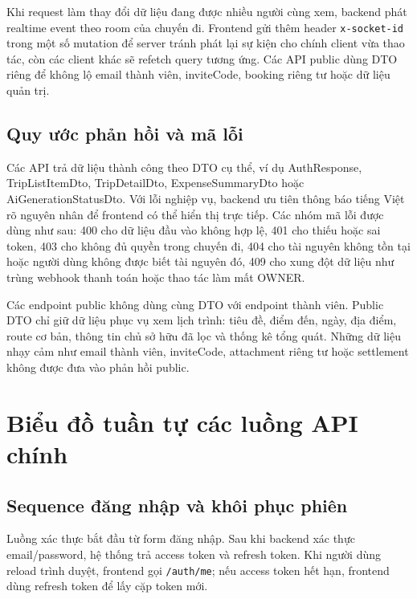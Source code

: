 \documentclass[a4paper]{report}
\begin{document}
Khi request làm thay đổi dữ liệu đang được nhiều người cùng xem, backend phát realtime event theo room của chuyến đi. Frontend gửi thêm header \texttt{x-socket-id} trong một số mutation để server tránh phát lại sự kiện cho chính client vừa thao tác, còn các client khác sẽ refetch query tương ứng. Các API public dùng DTO riêng để không lộ email thành viên, inviteCode, booking riêng tư hoặc dữ liệu quản trị.

\subsection{Quy ước phản hồi và mã lỗi}

Các API trả dữ liệu thành công theo DTO cụ thể, ví dụ AuthResponse, TripListItemDto, TripDetailDto, ExpenseSummaryDto hoặc AiGenerationStatusDto. Với lỗi nghiệp vụ, backend ưu tiên thông báo tiếng Việt rõ nguyên nhân để frontend có thể hiển thị trực tiếp. Các nhóm mã lỗi được dùng như sau: 400 cho dữ liệu đầu vào không hợp lệ, 401 cho thiếu hoặc sai token, 403 cho không đủ quyền trong chuyến đi, 404 cho tài nguyên không tồn tại hoặc người dùng không được biết tài nguyên đó, 409 cho xung đột dữ liệu như trùng webhook thanh toán hoặc thao tác làm mất OWNER.

Các endpoint public không dùng cùng DTO với endpoint thành viên. Public DTO chỉ giữ dữ liệu phục vụ xem lịch trình: tiêu đề, điểm đến, ngày, địa điểm, route cơ bản, thông tin chủ sở hữu đã lọc và thống kê tổng quát. Những dữ liệu nhạy cảm như email thành viên, inviteCode, attachment riêng tư hoặc settlement không được đưa vào phản hồi public.

\section{Biểu đồ tuần tự các luồng API chính}

\subsection{Sequence đăng nhập và khôi phục phiên}

Luồng xác thực bắt đầu từ form đăng nhập. Sau khi backend xác thực email/password, hệ thống trả access token và refresh token. Khi người dùng reload trình duyệt, frontend gọi \texttt{/auth/me}; nếu access token hết hạn, frontend dùng refresh token để lấy cặp token mới.
\end{document}

